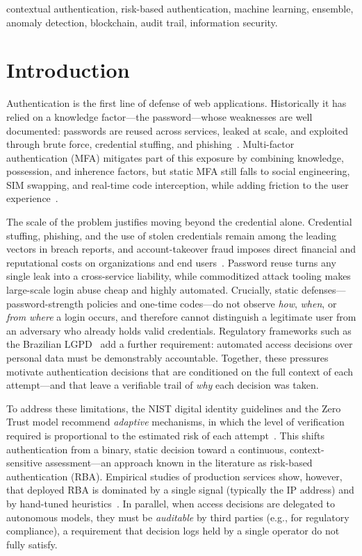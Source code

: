 \documentclass[conference]{IEEEtran}
\begin{document}
\begin{IEEEkeywords}
contextual authentication, risk-based authentication, machine
learning, ensemble, anomaly detection, blockchain, audit trail,
information security.
\end{IEEEkeywords}

\section{Introduction}
Authentication is the first line of defense of web applications.
Historically it has relied on a knowledge factor---the
password---whose weaknesses are well documented: passwords are reused
across services, leaked at scale, and exploited through brute force,
credential stuffing, and phishing~\cite{nist80063b,verizon2024}.
Multi-factor authentication (MFA) mitigates part of this exposure by
combining knowledge, possession, and inherence factors, but static MFA
still falls to social engineering, SIM swapping, and real-time code
interception, while adding friction to the user
experience~\cite{nist80063b}.

The scale of the problem justifies moving beyond the credential alone.
Credential stuffing, phishing, and the use of stolen credentials remain
among the leading vectors in breach reports, and account-takeover fraud
imposes direct financial and reputational costs on organizations and
end users~\cite{verizon2024}. Password reuse turns any single leak into
a cross-service liability, while commoditized attack tooling makes
large-scale login abuse cheap and highly automated. Crucially, static
defenses---password-strength policies and one-time codes---do not
observe \emph{how}, \emph{when}, or \emph{from where} a login occurs,
and therefore cannot distinguish a legitimate user from an adversary who
already holds valid credentials. Regulatory frameworks such as the
Brazilian LGPD~\cite{lgpd2018} add a further requirement: automated
access decisions over personal data must be demonstrably accountable.
Together, these pressures motivate authentication decisions that are
conditioned on the full context of each attempt---and that leave a
verifiable trail of \emph{why} each decision was taken.

To address these limitations, the NIST digital identity
guidelines and the Zero Trust model recommend \emph{adaptive}
mechanisms, in which the level of verification required is proportional
to the estimated risk of each attempt~\cite{nist80063b,rose2020}. This
shifts authentication from a binary, static decision toward a
continuous, context-sensitive assessment---an approach known in the
literature as risk-based authentication (RBA). Empirical studies of
production services show, however, that deployed RBA is dominated by a
single signal (typically the IP address) and by hand-tuned
heuristics~\cite{wiefling2019,wiefling2023}. In parallel, when access
decisions are delegated to autonomous models, they must be
\emph{auditable} by third parties (e.g., for regulatory compliance), a
requirement that decision logs held by a single operator do not fully
satisfy.
\end{document}

